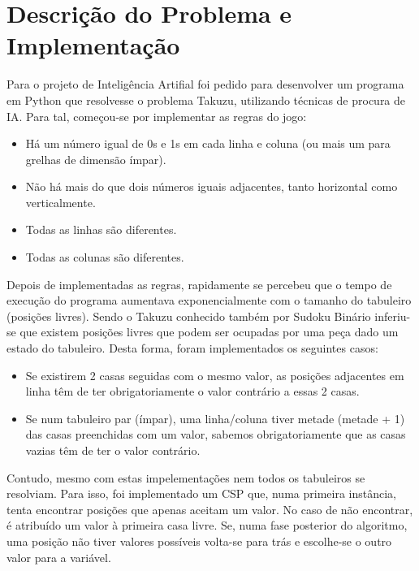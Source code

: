 \documentclass[12pt,a4paper]{article}
\begin{document}
  \section{Descrição do Problema e Implementação}

  Para o projeto de Inteligência Artifial foi pedido para desenvolver um programa em Python que resolvesse o problema Takuzu, utilizando técnicas de procura de IA.
  Para tal, começou-se por implementar as regras do jogo:

  \begin{itemize}
    \setlength{\itemsep}{0pt}
    \item Há um número igual de 0s e 1s em cada linha e coluna (ou mais um para grelhas de
    dimensão ímpar).
    \item Não há mais do que dois números iguais adjacentes, tanto horizontal como verticalmente.
    \item Todas as linhas são diferentes.
    \item Todas as colunas são diferentes.
  \end{itemize}

  Depois de implementadas as regras, rapidamente se percebeu que o tempo de execução do programa aumentava exponencialmente com o tamanho do tabuleiro (posições livres).
  Sendo o Takuzu conhecido também por Sudoku Binário inferiu-se que existem posições livres que podem ser ocupadas por uma peça dado um estado do tabuleiro. 
  Desta forma, foram implementados os seguintes casos:
  \begin{itemize}
    \setlength{\itemsep}{0pt}
    \item Se existirem 2 casas seguidas com o mesmo valor, as posições adjacentes em linha têm de ter obrigatoriamente o valor contrário a essas 2 casas.
    \item Se num tabuleiro par (ímpar), uma linha/coluna tiver metade (metade + 1) das casas preenchidas com um valor, sabemos obrigatoriamente que as casas vazias têm de ter o valor contrário. 
  \end{itemize}

  Contudo, mesmo com estas impelementações nem todos os tabuleiros se resolviam.
  Para isso, foi implementado um CSP que, numa primeira instância, tenta encontrar posições que apenas aceitam um valor.
  No caso de não encontrar, é atribuído um valor à primeira casa livre.
  Se, numa fase posterior do algoritmo, uma posição não tiver valores possíveis volta-se para trás e escolhe-se o outro valor para a variável.
\end{document}

